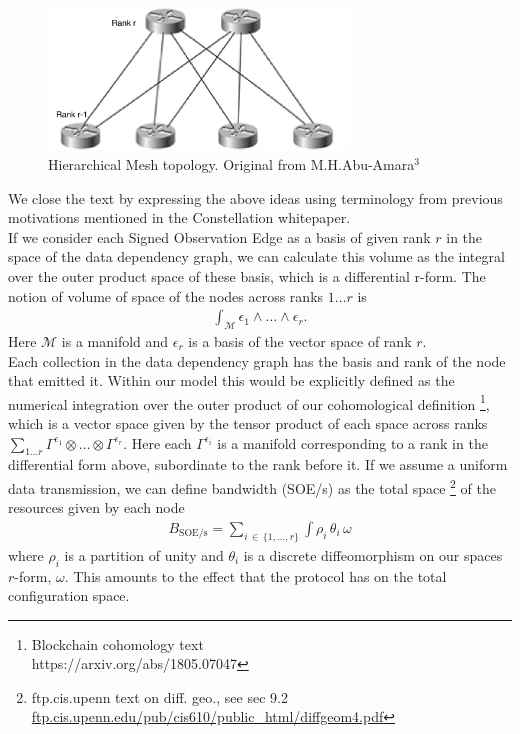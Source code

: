 \documentclass{article}
\begin{document}
\begin{figure}[h]
\centering
\includegraphics[width=8cm]{Designing_a_network_topology-M_H_Abu-Amara}
\caption{Hierarchical Mesh topology. Original from M.H.Abu-Amara$^3$} %
\end{figure}

We close the text by expressing the above ideas using terminology from previous motivations mentioned in the Constellation whitepaper. \\
If we consider each Signed Observation Edge as a basis of given rank $r$ in the space of the data dependency graph, we can calculate this volume as the integral over the outer product space of these basis, which is a differential r-form.
The notion of volume of space of the nodes across ranks $1 \dots r$ is
\begin{equation*} \label{eq1}
\begin{split}
\int_\mathcal{M} \epsilon_1 \wedge \dots \wedge \epsilon_r.
\end{split}
\end{equation*}
Here $\mathcal{M}$ is a manifold and $\epsilon_r$ is a basis of the vector space of rank $r$. \\
Each collection in the data dependency graph has the basis and rank of the node that emitted it. Within our model this would be explicitly defined as the numerical integration over the outer product of our cohomological definition
\footnote{Blockchain cohomology text\\ https://arxiv.org/abs/1805.07047},
which is a vector space given by the tensor product of each space across ranks 
{$\sum_{1 \dots r} \Gamma^{\epsilon_1} \otimes \dots \otimes \Gamma^{\epsilon_r}$}.
Here each $\Gamma^{\epsilon_i}$ is a manifold corresponding to a rank in the differential form above, subordinate to the rank before it. If we assume a uniform data transmission, we can define bandwidth (SOE/s) as the total space
\footnote{ftp.cis.upenn text on diff. geo., see sec 9.2\\ \url{ftp.cis.upenn.edu/pub/cis610/public_html/diffgeom4.pdf}} 
of the resources given by each node
\begin{equation*} \label{eq2}
\begin{split}
B_{\mathrm{SOE}/\mathrm{s}} = \sum_{i\,\in\,\{1, \dots, r\}} \int \rho_i\, \theta_i\, \omega
\end{split}
\end{equation*}
where $\rho_i$ is a partition of unity and $\theta_i$ is a discrete diffeomorphism on our spaces $r$-form, $\omega$. This amounts to the effect that the protocol has on the total configuration space.
\end{document}
